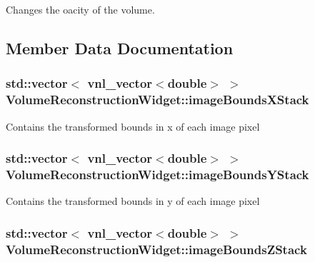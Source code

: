 Changes the oacity of the volume. 



\subsection{Member Data Documentation}
\hypertarget{class_volume_reconstruction_widget_ac955dfda26333bae884d4dbe1f60a4da}{
\subsubsection[{image\-Bounds\-X\-Stack}]{\setlength{\rightskip}{0pt plus 5cm}std\-::vector$<$ vnl\-\_\-vector$<$double$>$ $>$ {\bf Volume\-Reconstruction\-Widget\-::image\-Bounds\-X\-Stack}}}\label{d5/d55/class_volume_reconstruction_widget_ac955dfda26333bae884d4dbe1f60a4da}
Contains the transformed bounds in x of each image pixel \hypertarget{class_volume_reconstruction_widget_a4d5b04312c40280d1b32bd51f65d38b7}{
\subsubsection[{image\-Bounds\-Y\-Stack}]{\setlength{\rightskip}{0pt plus 5cm}std\-::vector$<$ vnl\-\_\-vector$<$double$>$ $>$ {\bf Volume\-Reconstruction\-Widget\-::image\-Bounds\-Y\-Stack}}}\label{d5/d55/class_volume_reconstruction_widget_a4d5b04312c40280d1b32bd51f65d38b7}
Contains the transformed bounds in y of each image pixel \hypertarget{class_volume_reconstruction_widget_a016899517e376967dd75c268c0e4d81c}{
\subsubsection[{image\-Bounds\-Z\-Stack}]{\setlength{\rightskip}{0pt plus 5cm}std\-::vector$<$ vnl\-\_\-vector$<$double$>$ $>$ {\bf Volume\-Reconstruction\-Widget\-::image\-Bounds\-Z\-Stack}}}\label{d5/d55/class_volume_reconstruction_widget_a016899517e376967dd75c268c0e4d81c}

